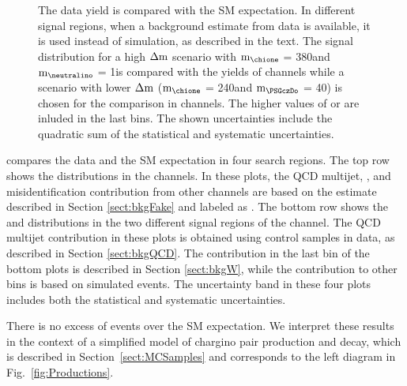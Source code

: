 \begin{figure}[!htb]
\caption{The data yield is compared with the SM expectation. In different signal regions, 
when a background estimate from data is available, it is used instead of simulation, as described in the text. The signal distribution for a high $\Delta \rm{m}$ scenario with ${\rm{m}}_{\chione}$ = 380\GeV and ${\rm{m}}_{\neutralino}$ = 1\GeV is compared with the yields of \leptonTau channels while a scenario with lower $\Delta\rm{m}$ (${\rm{m}}_{\chione}$ = 240\GeV and ${\rm{m}}_{\PSGczDo}$ = 40\GeV) is chosen for the comparison in \tauTau channels. The higher values of \mttwo or \SumMT are inluded in the last bins. The shown uncertainties include the quadratic sum of the statistical and systematic uncertainties.}
\label{fig:yield_final}
\end{figure}
compares the data and the SM expectation in four search regions. The top row 
shows the \mttwo distributions in the \leptonTau channels. 
In these plots, the QCD multijet, \wjets, and misidentification \Tau contribution from other channels 
are based on the estimate described in Section \ref{sect:bkgFake} and labeled as \wjets.
The bottom row shows the \mttwo and \SumMT distributions in the two different signal regions of the \tauTau channel. 
The QCD multijet contribution in these plots is obtained using control samples in data, as described in 
Section \ref{sect:bkgQCD}. The \wjets contribution in 
the last bin of the bottom plots is described in Section \ref{sect:bkgW}, while the contribution to other bins is based on simulated events.
The uncertainty band in these four plots includes both the statistical and systematic uncertainties.

There is no excess of events over the SM expectation.  We interpret these results in the context
of a simplified model of chargino pair production and decay, which is described in Section~\ref{sect:MCSamples} and corresponds 
to the left diagram in Fig.~\ref{fig:Productions}. 

